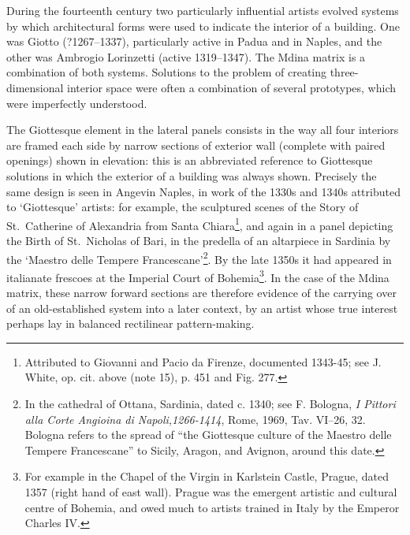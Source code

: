 \documentclass[a4paper,12pt]{article}
\begin{document}
During the fourteenth century two particularly influential artists
evolved systems by which architectural forms were used to indicate the
interior of a building.  One was Giotto (?1267--1337), particularly
active in Padua and in Naples, and the other was Ambrogio Lorinzetti
(active 1319--1347).  The Mdina matrix is a combination of both
systems.  Solutions to the problem of creating three-dimensional
interior space were often a combination of several prototypes, which
were imperfectly understood.

The Giottesque element in the lateral panels consists in the way all
four interiors are framed each side by narrow sections of exterior
wall (complete with paired openings) shown in elevation: this is an
abbreviated reference to Giottesque solutions in which the exterior of
a building was always shown.  Precisely the same design is seen in
Angevin Naples, in work of the 1330s and 1340s attributed to
`Giottesque' artists: for example, the sculptured scenes of the Story
of St.~Catherine of Alexandria from Santa Chiara\footnote{Attributed to
Giovanni and Pacio da Firenze, documented 1343-45; see J. White,
op. cit. above (note 15), p. 451 and Fig. 277.}, and again in a panel
depicting the Birth of St.~Nicholas of Bari, in the predella of an
altarpiece in Sardinia by the `Maestro delle Tempere
Francescane'\footnote{In the cathedral of Ottana, Sardinia, dated
c. 1340; see F. Bologna,\textit{ I Pittori alla Corte Angioina di
Napoli,1266-1414}, Rome, 1969, Tav. VI--26, 32.  Bologna refers to
the spread of ``the Giottesque culture of the Maestro delle Tempere
Francescane'' to Sicily, Aragon, and Avignon, around this date.}. By
the late 1350s it had appeared in italianate frescoes at the Imperial
Court of Bohemia\footnote{For example in the Chapel of the Virgin in
Karlstein Castle, Prague, dated 1357 (right hand of east wall).
Prague was the emergent artistic and cultural centre of Bohemia, and
owed much to artists trained in Italy by the Emperor Charles IV.}. In
the case of the Mdina matrix, these narrow forward sections are
therefore evidence of the carrying over of an old-established system
into a later context, by an artist whose true interest perhaps lay in
balanced rectilinear pattern-making.
\end{document}

